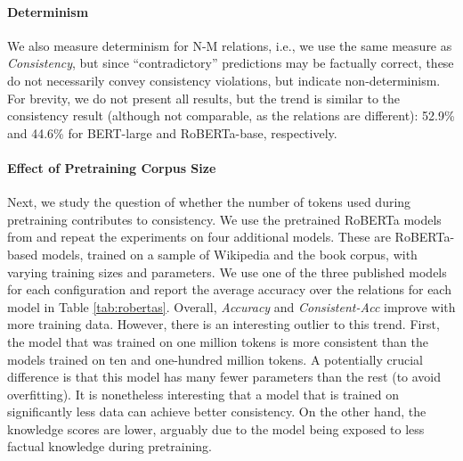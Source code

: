 

\paragraph{Determinism}
We also measure determinism for N-M relations, i.e., we use
the same measure as \textit{Consistency}, but since
``contradictory'' predictions may be factually correct,
these do not necessarily convey consistency violations, but
indicate non-determinism. For brevity, we do not present all
results, but the trend is similar to the consistency result
(although not comparable, as the relations are different): 52.9\% and 44.6\% for BERT-large and RoBERTa-base, respectively.













\paragraph{Effect of Pretraining Corpus Size}
Next, we study the question of whether the number of tokens used during pretraining contributes to consistency.
We use the pretrained RoBERTa models from \citet{robertas} and repeat the experiments on four additional models.
These are RoBERTa-based models, trained on a sample of Wikipedia and the book corpus, with varying training sizes and parameters. We use one of the three published models for each configuration and report the average accuracy over the relations for each model in Table \ref{tab:robertas}.
Overall, \textit{Accuracy} and
\textit{Consistent-Acc} improve
with more training data.
However, there is an interesting outlier to this trend.
First, the model that was trained on one million tokens is
more consistent than the models trained on ten and
one-hundred million tokens. A potentially crucial difference
is that this model
has many fewer parameters than the rest (to avoid overfitting). It is nonetheless interesting that a model that is trained on significantly less data can achieve better consistency. On the other hand, the knowledge scores are lower, arguably due to the model being exposed to less factual knowledge during pretraining.

